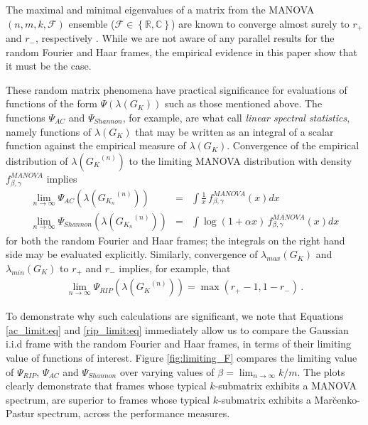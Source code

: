 \documentclass[a4paper,12pt]{article}
\newcommand{\TODO}[1]{ {\tt \color{red} [TODO:#1] } }
\newcommand{\R}{\ensuremath{\mathbb{R}}}
\newcommand{\C}{\ensuremath{\mathbb{C}}}
\newcommand{\Fc}{\ensuremath{\mathcal{F}}}
\newcommand{\m}{m}
\newcommand{\specstat}{\ensuremath{\Psi}}
\newcommand{\Xkn}{\ensuremath{X_{K_n}}}
\newcommand{\Gk}{\ensuremath{G_K}}
\newcommand{\Gkn}{\ensuremath{G_{K_n}}}
\begin{document}
The maximal and minimal eigenvalues of a matrix
from the MANOVA$(n,\m,k,\Fc)$ ensemble ($\Fc\in\left\{ \R,\C \right\}$) 
are known to converge almost surely 
to $r_+$ and $r_-$, respectively \cite{Johnstone2008}.
While we are not aware of any parallel results for the random Fourier and Haar
frames,  
the empirical evidence in this paper show that it must be the case.

These random matrix phenomena have practical significance for evaluations of
functions of the form $\specstat(\lambda(\Gk))$ such as those mentioned above.
The functions $\specstat_{AC}$ and $\specstat_{Shannon}$, for example, are what \cite{BaiBook}
call {\em linear spectral statistics}, namely functions of $\lambda(\Gk)$ that
may be written as an integral of a scalar function against the empirical measure of $\lambda(\Gk)$.
Convergence of the empirical
distribution of $\lambda(\Gk^{(n)})$ to the limiting 
MANOVA distribution with density $f^{MANOVA}_{\beta,\gamma}$ 
implies %
\begin{eqnarray} \label{ac_limit:eq}
\lim_{n\to\infty} \specstat_{AC}(\lambda(\Gkn^{(n)})) &=& \int \frac{1}{x}
\,f_{\beta,\gamma}^{MANOVA}(x)dx \\
\lim_{n\to\infty} \specstat_{Shannon}(\lambda(\Gkn^{(n)})) &=&  \int \log(1+\alpha x)
\,f_{\beta,\gamma}^{MANOVA}(x)dx \nonumber 
\end{eqnarray}
for both the random Fourier and Haar frames; 
the integrals on the right hand side may be evaluated explicitly.
Similarly, convergence of 
$\lambda_{max}(\Gk)$ and $\lambda_{min}(\Gk)$ to $r_+$ and $r_-$ implies, for
example, that 
\begin{eqnarray} \label{rip_limit:eq}
\lim_{n\to\infty} \specstat_{RIP}(\lambda(\Gk^{(n)})) = \max(r_+-1,1-r_-)\,.
\end{eqnarray}

To demonstrate why such calculations are significant,
we note that Equations \eqref{ac_limit:eq} and \eqref{rip_limit:eq} 
immediately allow us to compare the Gaussian i.i.d frame
with the random Fourier and Haar frames, 
in terms
of their limiting value of functions of interest.
Figure \ref{fig:limiting_F} compares the limiting value of $\specstat_{RIP}$,
$\specstat_{AC}$ and $\specstat_{Shannon}$ over varying values of $\beta=\lim_{n\to \infty}
k/\m$. The plots 
clearly demonstrate that frames whose typical
$k$-submatrix exhibits a MANOVA spectrum, are superior to frames whose typical
$k$-submatrix exhibits a Mar\u cenko-Pastur spectrum, 
across the performance measures.
\end{document}
